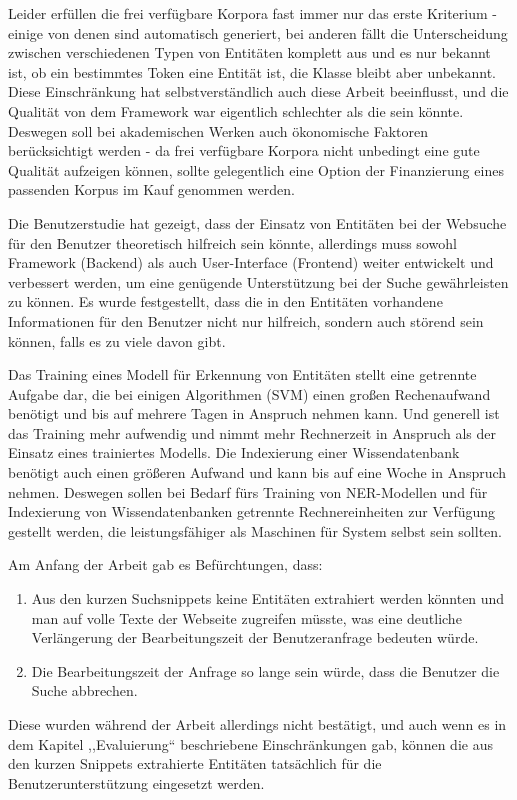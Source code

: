 Leider erfüllen die frei verfügbare Korpora fast immer nur das erste Kriterium - einige von denen sind automatisch generiert, bei anderen fällt die Unterscheidung zwischen verschiedenen Typen von Entitäten komplett aus und es nur bekannt ist, ob ein bestimmtes Token eine Entität ist, die Klasse bleibt aber unbekannt. Diese Einschränkung hat selbstverständlich auch diese Arbeit beeinflusst, und die Qualität von dem Framework war eigentlich schlechter als die sein könnte. Deswegen soll bei akademischen Werken auch ökonomische Faktoren berücksichtigt werden - da frei verfügbare Korpora nicht unbedingt eine gute Qualität aufzeigen können, sollte gelegentlich eine Option der Finanzierung eines passenden Korpus im Kauf genommen werden. 

Die Benutzerstudie hat gezeigt, dass der Einsatz von Entitäten bei der Websuche für den Benutzer theoretisch hilfreich sein könnte, allerdings muss sowohl Framework (Backend) als auch User-Interface (Frontend) weiter entwickelt und verbessert werden, um eine genügende Unterstützung bei der Suche gewährleisten zu können. Es wurde festgestellt, dass die in den Entitäten vorhandene Informationen für den Benutzer nicht nur hilfreich, sondern auch störend sein können, falls es zu viele davon gibt.

Das Training eines Modell für Erkennung von Entitäten stellt eine getrennte Aufgabe dar, die bei einigen Algorithmen (SVM) einen großen Rechenaufwand benötigt und bis auf mehrere Tagen in Anspruch nehmen kann. Und generell ist das Training mehr aufwendig und nimmt mehr Rechnerzeit in Anspruch als der Einsatz eines trainiertes Modells. Die Indexierung einer Wissendatenbank benötigt auch einen größeren Aufwand und kann bis auf eine Woche in Anspruch nehmen. Deswegen sollen bei Bedarf fürs Training von NER-Modellen und für Indexierung von Wissendatenbanken getrennte Rechnereinheiten zur Verfügung gestellt werden, die leistungsfähiger als Maschinen für System selbst sein sollten.  

Am Anfang der Arbeit gab es Befürchtungen, dass:
\begin{enumerate}
\item Aus den kurzen Suchsnippets keine Entitäten extrahiert werden könnten und man auf volle Texte der Webseite zugreifen müsste, was eine deutliche Verlängerung der Bearbeitungszeit der Benutzeranfrage bedeuten würde.
\item Die Bearbeitungszeit der Anfrage so lange sein würde, dass die Benutzer die Suche abbrechen.
\end{enumerate}
Diese wurden während der Arbeit allerdings nicht bestätigt, und auch wenn es in dem Kapitel ,,Evaluierung`` beschriebene Einschränkungen gab, können die aus den kurzen Snippets extrahierte Entitäten tatsächlich für die Benutzerunterstützung eingesetzt werden. 

